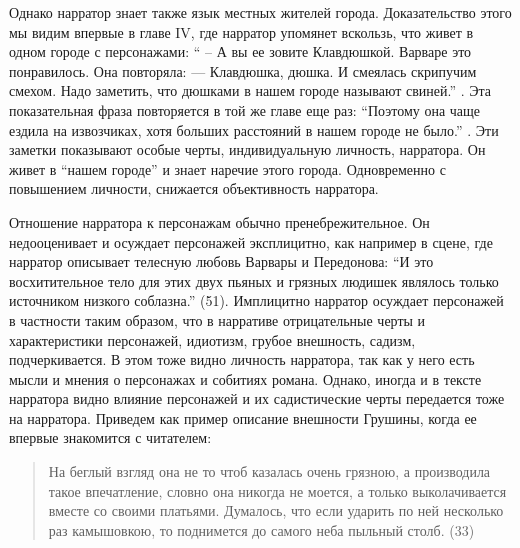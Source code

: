 \documentclass[12pt,a4paper]{article}
\begin{document}
Однако нарратор знает также язык местных жителей города. Доказательство этого мы видим впервые в главе IV, где нарратор упомянет вскользь, что живет в одном городе с персонажами: \enquote{ – А вы ее зовите Клавдюшкой.
Варваре это понравилось. Она повторяла:
— Клавдюшка, дюшка.
И смеялась скрипучим смехом. Надо заметить, что дюшками в 
нашем городе называют свиней.} \parencite[33]{sologub2004}. Эта показательная фраза повторяется в той же главе еще раз: \enquote{Поэтому она чаще ездила на извозчиках,
хотя больших расстояний в нашем городе не было.} \parencite[34]{sologub2004}. Эти заметки показывают особые черты, индивидуальную личность,  нарратора. Он живет в \enquote{нашем городе} и знает наречие этого города. Одновременно с повышением личности, снижается объективность нарратора.

Отношение нарратора к персонажам обычно пренебрежительное. Он недооценивает и осуждает персонажей эксплицитно, как например в сцене, где нарратор описывает телесную любовь Варвары и Передонова: 
\enquote{И это восхитительное тело для этих двух пьяных и грязных людишек являлось только источником низкого соблазна.} (51). 
Имплицитно нарратор осуждает персонажей в частности таким образом, что в нарративе отрицательные черты и характеристики персонажей, идиотизм, грубое внешность, садизм, подчеркивается. В этом тоже видно личность нарратора, так как у него есть мысли и мнения о персонажах и собитиях романа. Однако, иногда и в тексте нарратора видно влияние персонажей и их садистические черты передается тоже на нарратора. Приведем как пример описание внешности Грушины, когда ее впервые знакомится с читателем:

\begin{quote}
На беглый взгляд она не то
чтоб казалась очень грязною, а производила такое впечатление, словно
она никогда не моется, а только выколачивается вместе со своими 
платьями. Думалось, что если ударить по ней несколько раз камышовкою,
то поднимется до самого неба пыльный столб.
(33)
\end{quote}
\end{document}
